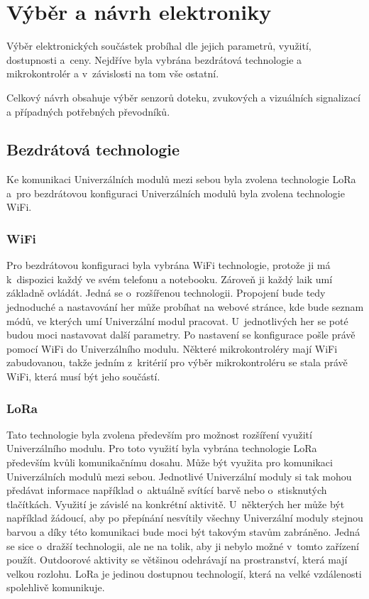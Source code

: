\chapter{Výběr a návrh elektroniky}
Výběr elektronických součástek probíhal dle jejich parametrů, využití, dostupnosti a~ceny. Nejdříve byla vybrána bezdrátová technologie a mikrokontrolér a v~závislosti 
na tom vše ostatní. 

Celkový návrh obsahuje výběr senzorů doteku, zvukových a vizuálních signalizací a případných potřebných převodníků. 

\section{Bezdrátová technologie}
Ke komunikaci Univerzálních modulů mezi sebou byla zvolena technologie LoRa a~pro bezdrátovou konfiguraci Univerzálních modulů byla zvolena technologie WiFi. 

\subsection{WiFi}
Pro bezdrátovou konfiguraci byla vybrána WiFi technologie, protože ji má k~dispozici každý ve svém telefonu a notebooku. Zároveň ji každý laik umí základně ovládát. Jedná se 
o~rozšířenou technologii. 
Propojení bude tedy jednoduché a nastavování her může probíhat na webové stránce, kde bude seznam módů, ve kterých umí Univerzální modul pracovat. U~jednotlivých her se poté 
budou moci nastavovat 
další parametry. Po nastavení se konfigurace pošle právě pomocí WiFi do Univerzálního modulu. Některé mikrokontroléry mají WiFi zabudovanou, takže jedním z~kritérií pro výběr 
mikrokontroléru se stala právě WiFi, která musí být jeho součástí. 

\subsection{LoRa}
Tato technologie byla zvolena především pro možnost rozšíření využití Univerzálního modulu. Pro toto využití byla vybrána technologie LoRa především kvůli komunikačnímu dosahu. 
Může být využita pro komunikaci Univerzálních modulů mezi sebou. Jednotlivé Univerzální moduly si tak mohou předávat informace například o~aktuálně svítící barvě nebo
o~stisknutých tlačítkách. Využití je
závislé na konkrétní aktivitě. U~některých her může být například žádoucí, aby po přepínání nesvítily všechny Univerzální moduly stejnou barvou a díky této komunikaci bude moci 
být takovým stavům zabráněno. Jedná se sice o~dražší technologii, 
ale ne na tolik, aby ji nebylo možné v~tomto zařízení použít. Outdoorové aktivity se většinou odehrávají na prostranství, která mají velkou rozlohu. LoRa je jedinou
dostupnou technologií, která na velké vzdálenosti spolehlivě komunikuje.  

